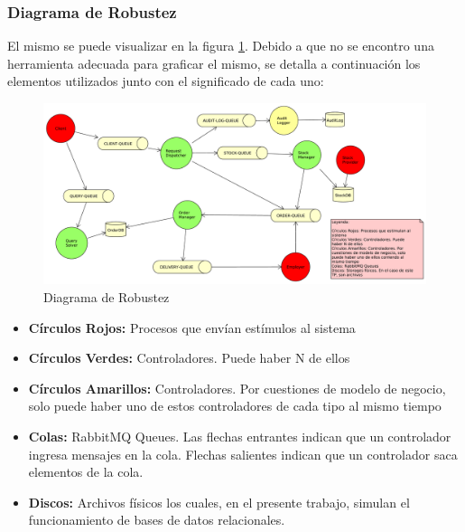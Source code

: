 \documentclass[a4paper,10pt]{article}
\begin{document}
        \subsubsection{Diagrama de Robustez}
        El mismo se puede visualizar en la figura \ref{DiagRobustez}. Debido 
        a que no se encontro una herramienta adecuada para graficar el mismo,
        se detalla a continuación los elementos utilizados junto con el
        significado de cada uno:

        \begin{figure}[!htb]                                             
            \centering                                                   
            \includegraphics[width=20cm,angle=90,origin=c]{Imagenes/robustez.pdf}        
            \caption{Diagrama de Robustez} \label{DiagRobustez}
        \end{figure}

        \begin{itemize}
            \item \textbf{Círculos Rojos:} Procesos que envían estímulos al 
            sistema
            \item \textbf{Círculos Verdes:} Controladores. Puede haber N 
            de ellos          
            \item \textbf{Círculos Amarillos:} Controladores. Por cuestiones
            de modelo de negocio, solo puede haber uno de estos controladores
            de cada tipo al mismo tiempo
            \item \textbf{Colas:} RabbitMQ Queues. Las flechas entrantes        
            indican que un controlador ingresa mensajes en la cola. Flechas
            salientes indican que un controlador saca elementos de la cola.
            \item \textbf{Discos:} Archivos físicos los cuales, en el presente
            trabajo, simulan el funcionamiento de bases de datos relacionales.
        \end{itemize}
\end{document}
